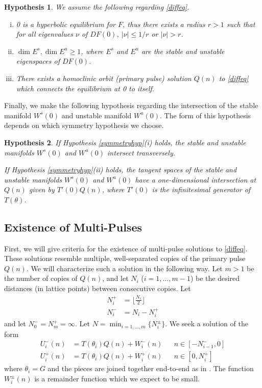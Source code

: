\documentclass[12pt]{article}
\newtheorem{hypothesis}{Hypothesis}
\begin{document}
\begin{hypothesis}\label{initialhyp}
We assume the following regarding \eqref{diffeq}.
\begin{enumerate}[(i)]
\item 0 is a hyperbolic equilibrium for $F$, thus there exists a radius $r > 1$ such that for all eigenvalues $\nu$ of $DF(0)$, $|\nu| \leq 1/r$ or $|\nu| > r$.
\item $\dim E^s, \dim E^u \geq 1$, where $E^s$ and $E^u$ are the stable and unstable eigenspaces of $DF(0)$.
\item There exists a homoclinic orbit (primary pulse) solution $Q(n)$ to \eqref{diffeq} which connects the equilibrium at 0 to itself.
\end{enumerate}
\end{hypothesis}

Finally, we make the following hypothesis regarding the intersection of the stable manifold $W^s(0)$ and unstable manifold $W^u(0)$. The form of this hypothesis depends on which symmetry hypothesis we choose.

\begin{hypothesis}\label{intersectionhyp}
If Hypothesis \ref{symmetryhyp}(i) holds, the stable and unstable manifolds $W^s(0)$ and $W^u(0)$ intersect transversely.

If Hypothesis \ref{symmetryhyp}(ii) holds, the tangent spaces of the stable and unstable manifolds $W^s(0)$ and $W^u(0)$ have a one-dimensional intersection at $Q(n)$ given by $T'(0) Q(n)$, where $T'(0)$ is the infinitesimal generator of $T(\theta)$.
\end{hypothesis}

\subsection{Existence of Multi-Pulses}

First, we will give criteria for the existence of multi-pulse solutions to \eqref{diffeq}. These solutions resemble multiple, well-separated copies of the primary pulse $Q(n)$. We will characterize such a solution in the following way. Let $m > 1$ be the number of copies of $Q(n)$, and let $N_i$ ($i = 1, \dots, m-1$) be the desired distances (in lattice points) between consecutive copies. Let 
\begin{equation}\label{Nipm}
\begin{aligned}
N_i^+ &= \lfloor \frac{N_i}{2} \rfloor \\
N_i^- &= N_i - N_i^+
\end{aligned}
\end{equation}
and let $N_0^- = N_m^+ = \infty$. Let $N = \min _{i = 1, \dots, m}\{ N_i^\pm \}$. We seek a solution of the form
\begin{align}\label{Upiecewise}
U_i^-(n) &= T(\theta_i) Q(n) + W_i^-(n) && n \in [-N_{i-1}^-, 0] \\
U_i^+(n) &= T(\theta_i) Q(n) + W_i^+(n) && n \in [0, N_i^+]
\end{align}
where $\theta_i = G$ and the pieces are joined together end-to-end as in \cite{Sandstede1998}. The function $W_i^\pm(n)$ is a remainder function which we expect to be small.
\end{document}
